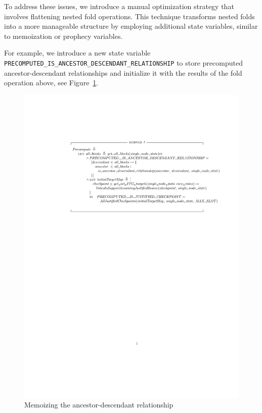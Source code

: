 To address these issues, we introduce a manual optimization strategy that
involves flattening nested fold operations. This technique transforms nested
folds into a more manageable structure by employing additional \tlap{} state
variables, similar to memoization or prophecy variables.

For example, we introduce a new \tlap{} state variable
\texttt{PRECOMPUTED\_IS\_ANCESTOR\_DESCENDANT\_RELATIONSHIP} to store
precomputed ancestor-descendant relationships and initialize it with the results
of the fold operation above, see Figure~\ref{fig:relationship-memo}.

\begin{figure}
  \includegraphics[width=\textwidth]{images/precompute.pdf}
  \caption{Memoizing the ancestor-descendant relationship}%
  \label{fig:relationship-memo}
\end{figure}


